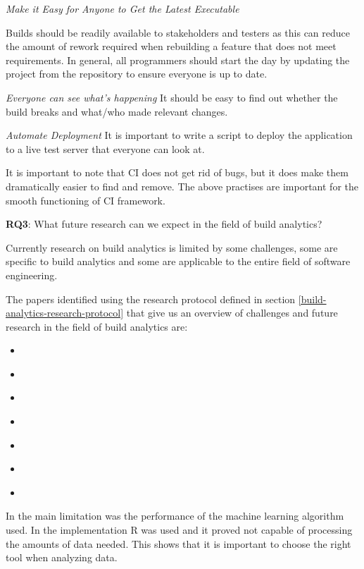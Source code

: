 \documentclass[]{book}
\providecommand{\tightlist}{%
  \setlength{\itemsep}{0pt}\setlength{\parskip}{0pt}}
\begin{document}
\emph{Make it Easy for Anyone to Get the Latest Executable}

Builds should be readily available to stakeholders and testers as this
can reduce the amount of rework required when rebuilding a feature that
does not meet requirements. In general, all programmers should start the
day by updating the project from the repository to ensure everyone is up
to date.

\emph{Everyone can see what's happening} It should be easy to find out
whether the build breaks and what/who made relevant changes.

\emph{Automate Deployment} It is important to write a script to deploy
the application to a live test server that everyone can look at.

It is important to note that CI does not get rid of bugs, but it does
make them dramatically easier to find and remove. The above practises
are important for the smooth functioning of CI framework.

\textbf{RQ3}: What future research can we expect in the field of build
analytics?

Currently research on build analytics is limited by some challenges,
some are specific to build analytics and some are applicable to the
entire field of software engineering.

The papers identified using the research protocol defined in section
\ref{build-analytics-research-protocol} that give us an overview of
challenges and future research in the field of build analytics are:

\begin{itemize}
\tightlist
\item
  \citet{bisong2017built}
\item
  \citet{pinto2018work}
\item
  \citet{santolucito2018statically}
\item
  \citet{baltes2018no}
\item
  \citet{zhao2017impact}
\item
  \citet{vassallo2018break}
\item
  \citet{beller2017oops}
\end{itemize}

In \citet{bisong2017built} the main limitation was the performance of
the machine learning algorithm used. In the implementation R was used
and it proved not capable of processing the amounts of data needed. This
shows that it is important to choose the right tool when analyzing data.
\end{document}

